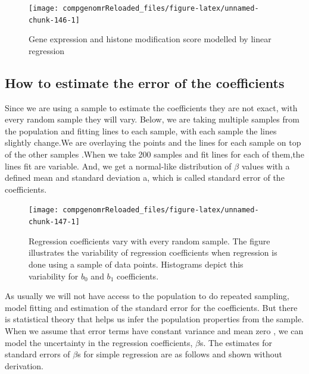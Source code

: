 \documentclass[12pt,]{krantz}
\theoremstyle{definition}
\theoremstyle{definition}
\theoremstyle{definition}
\theoremstyle{remark}
\begin{document}
\begin{figure}

{\centering \texttt{[image: compgenomrReloaded\_files/figure-latex/unnamed-chunk-146-1]} 

}

\caption{Gene expression and histone modification score modelled by linear regression}\label{fig:unnamed-chunk-146}
\end{figure}

\hypertarget{how-to-estimate-the-error-of-the-coefficients}{%
\subsection{How to estimate the error of the
coefficients}\label{how-to-estimate-the-error-of-the-coefficients}}

Since we are using a sample to estimate the coefficients they are not
exact, with every random sample they will vary. Below, we are taking
multiple samples from the population and fitting lines to each sample,
with each sample the lines slightly change.We are overlaying the points
and the lines for each sample on top of the other samples .When we take
200 samples and fit lines for each of them,the lines fit are variable.
And, we get a normal-like distribution of \(\beta\) values with a
defined mean and standard deviation a, which is called standard error of
the coefficients.

\begin{figure}

{\centering \texttt{[image: compgenomrReloaded\_files/figure-latex/unnamed-chunk-147-1]} 

}

\caption{Regression coefficients vary with every random sample. The figure illustrates the variability of regression coefficients when regression is done using a sample of data points. Histograms depict this variability for $b_0$ and $b_1$ coefficients.}\label{fig:unnamed-chunk-147}
\end{figure}

As usually we will not have access to the population to do repeated
sampling, model fitting and estimation of the standard error for the
coefficients. But there is statistical theory that helps us infer the
population properties from the sample. When we assume that error terms
have constant variance and mean zero , we can model the uncertainty in
the regression coefficients, \(\beta\)s. The estimates for standard
errors of \(\beta\)s for simple regression are as follows and shown
without derivation.
\end{document}
